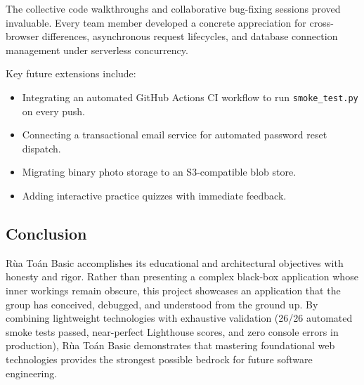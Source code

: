 The collective code walkthroughs and collaborative bug-fixing sessions proved invaluable. Every team
member developed a concrete appreciation for cross-browser differences, asynchronous request lifecycles,
and database connection management under serverless concurrency.

Key future extensions include:
\begin{itemize}
  \item Integrating an automated GitHub Actions CI workflow to run \texttt{smoke\_test.py} on every push.
  \item Connecting a transactional email service for automated password reset dispatch.
  \item Migrating binary photo storage to an S3-compatible blob store.
  \item Adding interactive practice quizzes with immediate feedback.
\end{itemize}

\subsection{Conclusion}
Rùa Toán Basic accomplishes its educational and architectural objectives with honesty and rigor.
Rather than presenting a complex black-box application whose inner workings remain obscure, this project
showcases an application that the group has conceived, debugged, and understood from the ground up.
By combining lightweight technologies with exhaustive validation (26/26 automated smoke tests passed,
near-perfect Lighthouse scores, and zero console errors in production), Rùa Toán Basic demonstrates that
mastering foundational web technologies provides the strongest possible bedrock for future software engineering.
\clearpage
